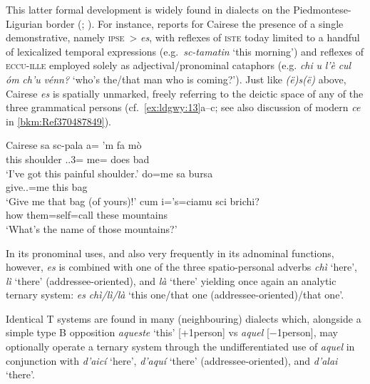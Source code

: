 \documentclass[output=paper]{langsci/langscibook}
\begin{document}
This latter formal development is widely found in dialects on the
Piedmontese-Ligurian border (\citealt[251]{Forner:1997a};
\citealt[98f]{Irsara:2009a}). For instance,
\textcites{Parry:1991a}[150--153]{Parry:2005a} reports for Cairese the presence
of a single demonstrative, namely \textsc{ipse}~> \emph{es}, with reflexes of
\textsc{iste} today limited to a handful of lexicalized temporal expressions
(e.g.\ \emph{sc-tamatin} ‘this morning’) and reflexes of \textsc{eccu-ille}
employed solely as adjectival/pronominal cataphors (e.g. \emph{chi} \emph{u}
\emph{l’è} \emph{cul} \emph{óm} \emph{ch’u} \emph{vénn?} ‘who’s the/that man
who is coming?’). Just like \emph{(ë)s(ë)} above, Cairese \emph{es} is
spatially unmarked, freely referring to the deictic space of any of the three
grammatical persons (cf.\ \ref{ex:ldgwy:13}a--c; see also discussion of
modern  \emph{ce} in \cref{bkm:Ref370487849}).

\ea\label{bkm:Ref370498976}\label{ex:ldgwy:13}Cairese \citep{Parry:1991a,Parry:2005a}
    \ea
    \gll  sa  sc-pala a= ’m  fa  mò\\
             this  shoulder  \Sbj{}.\Cl{}.3=  me=  does  bad\\
    \glt \enquote*{I’ve got this painful shoulder.}
    \ex
    \gll  do=me  sa  bursa\\
             give.\Imp{}.\Ssg{}=me  this  bag\\
    \glt \enquote*{Give me that bag (of yours)!}
    \ex
    \gll  cum  i=’s=ciamu  sci  brichi?\\
             how  them=self=call  these  mountains\\
    \glt \enquote*{What’s the name of those mountains?}
    \z
\z

In its pronominal uses, and also very frequently in its adnominal functions,
however, \emph{es} is combined with one of the three spatio-personal adverbs
\emph{chì} ‘here’, \emph{lì} ‘there’ (addressee-oriented), and \emph{là}
‘there’ yielding once again an analytic ternary system: \emph{es}
\emph{chì/lì/là} ‘this one/that one (addressee-oriented)/that one’.

Identical T systems are found in many (neighbouring)  dialects
\citep[21]{CollegidOccitania} which, alongside a simple type B
opposition \emph{aqueste} ‘this’ [+1person] vs \emph{aquel}
[−1person], may optionally operate a ternary system through the
undifferentiated use of \emph{aquel} in conjunction with \emph{d’aicí} ‘here’,
\emph{d’aquí} ‘there’ (addressee-oriented), and \emph{d’alai} ‘there’.
\end{document}
